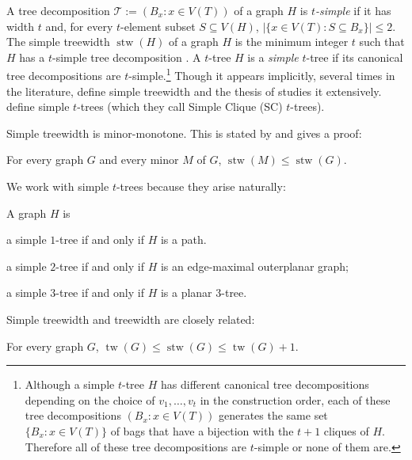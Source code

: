 \documentclass[kpfonts]{patmorin}
\DeclareMathOperator{\tw}{tw}
\DeclareMathOperator{\stw}{stw}
\theoremstyle{named}
\begin{document}
A tree decomposition $\mathcal{T}:=(B_x:x\in V(T))$ of a graph $H$ is \emph{$t$-simple} if it has width $t$ and, for every $t$-element subset $S\subseteq V(H)$, $|\{x\in V(T):S\subseteq B_x\}|\le 2$.  The simple treewidth $\stw(H)$ of a graph $H$ is the minimum integer $t$ such that $H$ has a $t$-simple tree decomposition \cite{knauer.ueckerdt:simple}.  A $t$-tree $H$ is a \emph{simple} $t$-tree if its canonical tree decompositions are $t$-simple.\footnote{Although a simple $t$-tree $H$ has different canonical tree decompositions depending on the choice of $v_1,\ldots,v_t$ in the construction order, each of these tree decompositions $(B_x:x\in V(T))$ generates the same set $\{B_x:x\in V(T)\}$ of bags that have a bijection with the $t+1$ cliques of $H$.  Therefore all of these tree decompositions are $t$-simple or none of them are.}  Though it appears implicitly, several times in the literature, \citet{knauer.ueckerdt:simple} define simple treewidth and the thesis of \citet{wulf:stacked} studies it extensively. \citet{markenzon.justel.ea:subclasses} define simple $t$-trees (which they call Simple Clique (SC) $t$-trees).

Simple treewidth is minor-monotone. This is stated by \citet{knauer.ueckerdt:simple} and \citet[Theorem~5.2]{wulf:stacked} gives a proof:

\begin{lem}\label{simple-minor-closed}
    For every graph $G$ and every minor $M$ of $G$, $\stw(M)\le\stw(G)$.
\end{lem}

We work with simple $t$-trees because they arise naturally:

\begin{lem}\label{simple-small-cases}
    A graph $H$ is
    \begin{compactenum}[(i)]
        \item a simple $1$-tree if and only if $H$ is a path.
        \item a simple $2$-tree if and only if $H$ is an edge-maximal outerplanar graph;
        \item a simple $3$-tree if and only if $H$ is a planar 3-tree.
    \end{compactenum}
\end{lem}

Simple treewidth and treewidth are closely related:

\begin{lem}\label{simple-treewidth-vs-treewidth}
    For every graph $G$, $\tw(G)\le \stw(G)\le \tw(G)+1$.
\end{lem}
\end{document}
